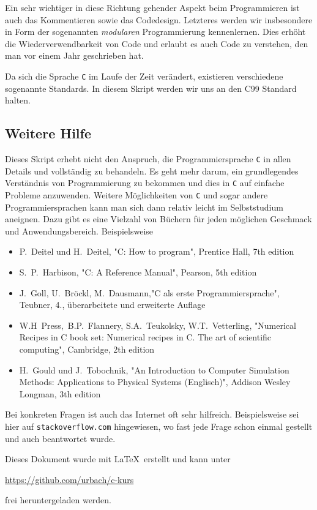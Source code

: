 Ein sehr wichtiger in diese Richtung gehender Aspekt beim Programmieren ist auch das Kommentieren sowie das Code\-design.
Letzteres werden wir insbesondere in Form der sogenannten \emph{modularen} Programmierung kennenlernen.
Dies erhöht die Wiederverwendbarkeit von Code und erlaubt es auch Code zu verstehen, den man vor einem Jahr geschrieben hat.

Da sich die Sprache \texttt{C} im Laufe der Zeit verändert, existieren verschiedene sogenannte Standards.
In diesem Skript werden wir uns an den C99 Standard halten.

\subsection{Weitere Hilfe}

Dieses Skript erhebt nicht den Anspruch, die Programmiersprache \texttt{C} in allen Details und vollständig zu behandeln.
Es geht mehr darum, ein grundlegendes Verständnis von Programmierung zu bekommen und dies in \texttt{C} auf einfache Probleme anzuwenden.
Weitere Möglichkeiten von \texttt{C} und sogar andere Programmiersprachen kann man sich dann relativ leicht im Selbststudium aneignen.
Dazu gibt es eine Vielzahl von Büchern für jeden möglichen Geschmack und Anwendungsbereich.
Beispielsweise
\begin{itemize}
\item P.~Deitel und H.~Deitel, "C: How to program", Prentice Hall, 7th edition
\item S.~P.~Harbison, "C: A Reference Manual", Pearson, 5th edition
\item J.~Goll, U.~Bröckl, M.~Dausmann,"C als erste Programmiersprache", Teubner, 4., überarbeitete und erweiterte Auflage
\item W.H~Press,~B.P.~Flannery, S.A.~Teukolsky, W.T.~Vetterling, "Numerical Recipes in C book set: Numerical recipes in C. The art of scientific computing", Cambridge, 2th edition
\item H.~Gould und J.~Tobochnik, "{}An Introduction to Computer Simulation Methods: Applications to Physical Systems (Englisch)", Addison Wesley Longman, 3th edition
\end{itemize}
Bei konkreten Fragen ist auch das Internet oft sehr hilfreich.
Beispielsweise sei hier auf \texttt{stackoverflow.com} hingewiesen, wo fast jede Frage schon einmal gestellt und auch beantwortet wurde.

Dieses Dokument wurde mit \LaTeX\ erstellt und kann unter 
\begin{center}
  \url{https://github.com/urbach/c-kurs} 
\end{center}
frei heruntergeladen werden.
